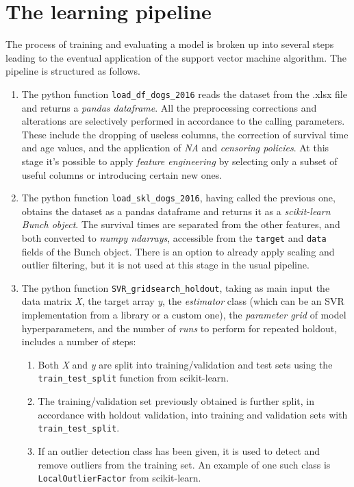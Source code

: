 \documentclass[12pt]{report}
\begin{document}
\section{The learning pipeline} \label{learnpipeline}
The process of training and evaluating a model is broken up into several steps leading to the eventual application of the support vector machine algorithm. The pipeline is structured as follows.
\begin{enumerate}
\item The python function \texttt{load\_df\_dogs\_2016} reads the dataset from the .xlsx file and returns a \textit{pandas dataframe}. All the preprocessing corrections and alterations are selectively performed in accordance to the calling parameters. These include the dropping of useless columns, the correction of survival time and age values, and the application of \textit{NA} and \textit{censoring policies}. At this stage it's possible to apply \textit{feature engineering} by selecting only a subset of useful columns or introducing certain new ones.
\item The python function \texttt{load\_skl\_dogs\_2016}, having called the previous one, obtains the dataset as a pandas dataframe and returns it as a \textit{scikit-learn Bunch object}. The survival times are separated from the other features, and both converted to \textit{numpy ndarrays}, accessible from the \texttt{target} and \texttt{data} fields of the Bunch object. There is an option to already apply scaling and outlier filtering, but it is not used at this stage in the usual pipeline.
\item The python function \texttt{SVR\_gridsearch\_holdout}, taking as main input the data matrix \textit{X}, the target array \textit{y}, the \textit{estimator} class (which can be an SVR implementation from a library or a custom one), the \textit{parameter grid} of model hyperparameters, and the number of \textit{runs} to perform for repeated holdout, includes a number of steps:
\begin{enumerate}
\item Both \textit{X} and \textit{y} are split into training/validation and test sets using the \texttt{train\_test\_split} function from scikit-learn.
\item The training/validation set previously obtained is further split, in accordance with holdout validation, into training and validation sets with \texttt{train\_test\_split}.
\item If an outlier detection class has been given, it is used to detect and remove outliers from the training set. An example of one such class is \texttt{LocalOutlierFactor} from scikit-learn.

\end{enumerate}
\end{enumerate}
\end{document}
